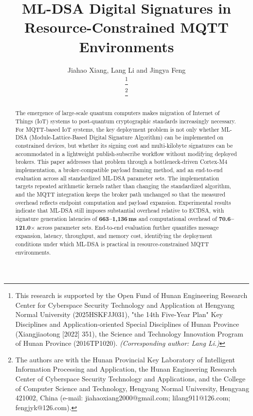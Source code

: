 \documentclass[final, twoside]{IEEEtran} %
\begin{document}
\title{ML-DSA Digital Signatures in Resource-Constrained MQTT Environments}

\author{ Jiahao Xiang, Lang Li  and Jingya Feng

	\thanks{This research is supported by the Open Fund of Hunan Engineering Research Center for Cyberspace Security Technology and Application at Hengyang Normal University (2025HSKFJJ031), "the 14th Five-Year Plan" Key Disciplines and Application-oriented Special Disciplines of Hunan Province (Xiangjiaotong [2022] 351), the Science and Technology Innovation Program of Hunan Province (2016TP1020). \textit{(Corresponding
			author: Lang Li.)}}

	\thanks{The authors are with the Hunan Provincial Key Laboratory of Intelligent Information Processing and Application, the Hunan Engineering Research Center of Cyberspace Security Technology and Applications, and the College of Computer Science and Technology, Hengyang Normal University, Hengyang 421002, China (e-mail: jiahaoxiang2000@gmail.com; lilang911@126.com; fengjyk@126.com).}

}


\maketitle

\begin{abstract}
	The emergence of large-scale quantum computers makes migration of Internet of Things (IoT) systems to post-quantum cryptographic standards increasingly necessary. For MQTT-based IoT systems, the key deployment problem is not only whether ML-DSA (Module-Lattice-Based Digital Signature Algorithm) can be implemented on constrained devices, but whether its signing cost and multi-kilobyte signatures can be accommodated in a lightweight publish-subscribe workflow without modifying deployed brokers. This paper addresses that problem through a bottleneck-driven Cortex-M4 implementation, a broker-compatible payload framing method, and an end-to-end evaluation across all standardized ML-DSA parameter sets. The implementation targets repeated arithmetic kernels rather than changing the standardized algorithm, and the MQTT integration keeps the broker path unchanged so that the measured overhead reflects endpoint computation and payload expansion. Experimental results indicate that ML-DSA still imposes substantial overhead relative to ECDSA, with signature generation latencies of \textbf{663--1,136\,ms} and computational overhead of \textbf{70.6--121.0$\times$} across parameter sets. End-to-end evaluation further quantifies message expansion, latency, throughput, and memory cost, identifying the deployment conditions under which ML-DSA is practical in resource-constrained MQTT environments.
\end{abstract}
\end{document}
